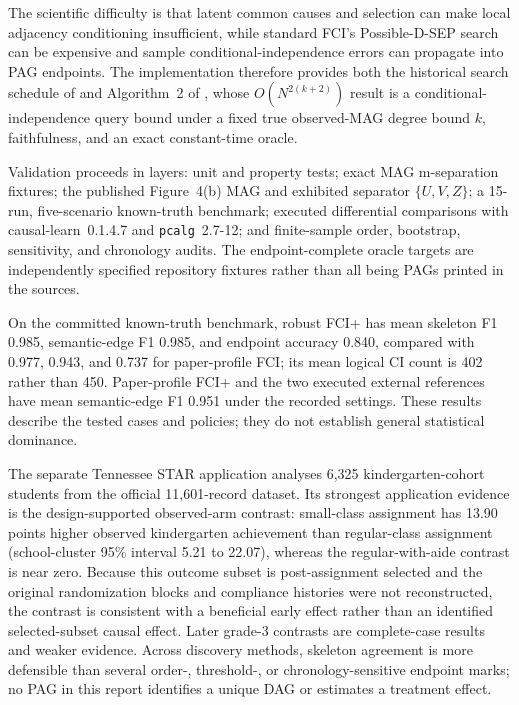 \documentclass[11pt,a4paper,oneside]{report}
\newcommand{\code}[1]{\texttt{#1}}
\begin{document}
The scientific difficulty is that latent common causes and selection can make
local adjacency conditioning insufficient, while standard FCI's
Possible-D-SEP search can be expensive and sample conditional-independence
errors can propagate into PAG endpoints.  The implementation therefore
provides both the historical search schedule of \citet{spirtes2000causation}
and Algorithm~2 of \citet{claassen2013learning}, whose
\(O(N^{2(k+2)})\) result is a conditional-independence query bound under a
fixed true observed-MAG degree bound \(k\), faithfulness, and an exact
constant-time oracle.

Validation proceeds in layers: unit and property tests; exact MAG
m-separation fixtures; the published Figure~4(b) MAG and exhibited separator
\(\{U,V,Z\}\); a 15-run, five-scenario known-truth benchmark; executed
differential comparisons with causal-learn~0.1.4.7 and
\code{pcalg}~2.7-12; and finite-sample order, bootstrap, sensitivity, and
chronology audits.  The endpoint-complete oracle targets are independently
specified repository fixtures rather than all being PAGs printed in the
sources.

On the committed known-truth benchmark, robust FCI+ has mean skeleton F1
0.985, semantic-edge F1 0.985, and endpoint accuracy 0.840, compared with
0.977, 0.943, and 0.737 for paper-profile FCI; its mean logical CI count is
402 rather than 450.  Paper-profile FCI+ and the two executed external
references have mean semantic-edge F1 0.951 under the recorded settings.
These results describe the tested cases and policies; they do not establish
general statistical dominance.

The separate Tennessee STAR application analyses 6,325 kindergarten-cohort
students from the official 11,601-record dataset.  Its strongest application
evidence is the design-supported observed-arm contrast: small-class assignment
has 13.90 points higher observed kindergarten achievement than regular-class
assignment (school-cluster 95\% interval 5.21 to 22.07), whereas the
regular-with-aide contrast is near zero.  Because this outcome subset is
post-assignment selected and the original randomization blocks and compliance
histories were not reconstructed, the contrast is consistent with a
beneficial early effect rather than an identified selected-subset causal
effect.  Later grade-3 contrasts are complete-case results and weaker
evidence.  Across discovery methods, skeleton agreement is more defensible
than several order-, threshold-, or chronology-sensitive endpoint marks; no
PAG in this report identifies a unique DAG or estimates a treatment effect.
\end{document}
